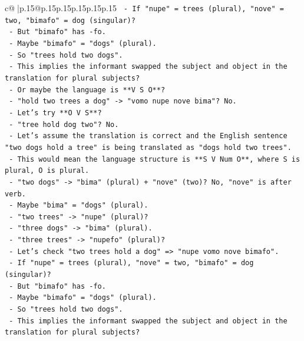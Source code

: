 \documentclass{article}
\begin{document}
{\begin{supertabular}{c@{$\;$}|p{.15\linewidth}@{}p{.15\linewidth}p{.15\linewidth}p{.15\linewidth}p{.15\linewidth}p{.15\linewidth}}
{{{\texttt{             {-} If "nupe" = trees (plural), "nove" = two, "bimafo" = dog (singular)?} \\
\texttt{             {-} But "bimafo" has {-}fo.} \\
\texttt{             {-} Maybe "bimafo" = "dogs" (plural).} \\
\texttt{             {-} So "trees hold two dogs".} \\
\texttt{             {-} This implies the informant swapped the subject and object in the translation for plural subjects?} \\
\texttt{             {-} Or maybe the language is **V S O**?} \\
\texttt{             {-} "hold two trees a dog" {-}> "vomo nupe nove bima"? No.} \\
\texttt{             {-} Let's try **O V S**?} \\
\texttt{             {-} "tree hold dog two"? No.} \\
\texttt{             {-} Let's assume the translation is correct and the English sentence "two dogs hold a tree" is being translated as "dogs hold two trees".} \\
\texttt{             {-} This would mean the language structure is **S V Num O**, where S is plural, O is plural.} \\
\texttt{             {-} "two dogs" {-}> "bima" (plural) + "nove" (two)? No, "nove" is after verb.} \\
\texttt{             {-} Maybe "bima" = "dogs" (plural).} \\
\texttt{             {-} "two trees" {-}> "nupe" (plural)?} \\
\texttt{             {-} "three dogs" {-}> "bima" (plural).} \\
\texttt{             {-} "three trees" {-}> "nupefo" (plural)?} \\
\texttt{             {-} Let's check "two trees hold a dog" => "nupe vomo nove bimafo".} \\
\texttt{             {-} If "nupe" = trees (plural), "nove" = two, "bimafo" = dog (singular)?} \\
\texttt{             {-} But "bimafo" has {-}fo.} \\
\texttt{             {-} Maybe "bimafo" = "dogs" (plural).} \\
\texttt{             {-} So "trees hold two dogs".} \\
\texttt{             {-} This implies the informant swapped the subject and object in the translation for plural subjects?} \\
}}}
\end{supertabular}}
\end{document}
